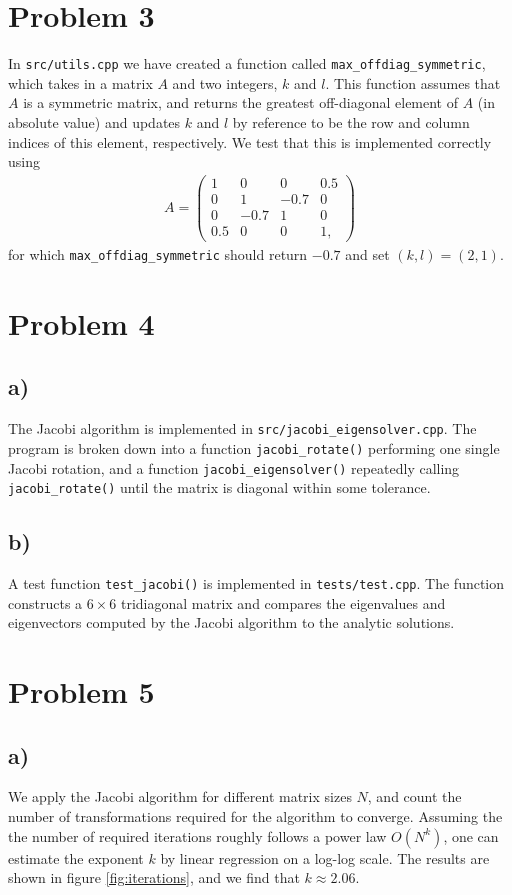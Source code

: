 \documentclass[english,notitlepage,reprint,nofootinbib]{revtex4-2}  %
\begin{document}
\section{Problem 3}
In \texttt{src/utils.cpp} we have created a function called \texttt{max\_offdiag\_symmetric}, which takes in a matrix \(A\) and two integers, \(k\) and \(l\). This function assumes that \(A\) is a symmetric matrix, and returns the greatest off-diagonal element of \(A\) (in absolute value) and updates \(k\) and \(l\) by reference to be the row and column indices of this element, respectively. We test that this is implemented correctly using 
\begin{align}
    A = \begin{pmatrix}
        1 & 0 & 0 & 0.5 \\ 
        0 & 1 & -0.7 & 0 \\ 
        0 & -0.7 & 1 & 0 \\ 
        0.5 & 0 & 0 & 1,
    \end{pmatrix}
\end{align} 
for which \texttt{max\_offdiag\_symmetric} should return \(-0.7\) and set \((k,l)=(2,1)\).


\section{Problem 4}
\subsection*{a)}
The Jacobi algorithm is implemented in \texttt{src/jacobi\_eigensolver.cpp}.
The program is broken down into a function \texttt{jacobi\_rotate()} performing one single Jacobi rotation, and a function \texttt{jacobi\_eigensolver()} repeatedly calling \texttt{jacobi\_rotate()} until the matrix is diagonal within some tolerance. 

\subsection*{b)}
A test function \texttt{test\_jacobi()} is implemented in \texttt{tests/test.cpp}.
The function constructs a $6\times6$ tridiagonal matrix and compares the eigenvalues and eigenvectors computed by the Jacobi algorithm to the analytic solutions.


\section{Problem 5}
\subsection*{a)}
We apply the Jacobi algorithm for different matrix sizes \(N\), and count the number of transformations required for the algorithm to converge.
Assuming the the number of required iterations roughly follows a power law \(O(N^k)\), one can estimate the exponent \(k\) by linear regression on a log-log scale.
The results are shown in figure \ref{fig:iterations}, and we find that \(k\approx 2.06\).
\newline
\newline
\end{document}
